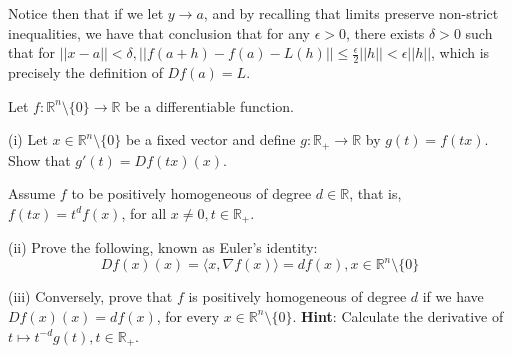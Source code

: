 \begin{solution}
    Notice then that if we let $y \rightarrow a$, and by recalling that limits preserve non-strict inequalities, we have that conclusion that for any $\epsilon > 0$, there exists $\delta > 0$ such that for $\lvert \lvert x - a \rvert \rvert < \delta, \lvert \lvert f(a+ h) - f(a) - L(h) \rvert \rvert \leq \frac{\epsilon}{2} \lvert \lvert h \rvert \rvert < \epsilon \lvert \lvert h \rvert \rvert$, which is precisely the definition of $Df(a) = L$.
\end{solution}

\begin{exercise}{32}
    Let $f: \mathbb{R}^n \setminus \{0\} \rightarrow \mathbb{R}$ be a differentiable function.

    (i) Let $x \in \mathbb{R}^n \setminus \{0\}$ be a fixed vector and define $g: \mathbb{R}_{+} \rightarrow \mathbb{R}$ by $g(t) = f(tx)$.
    Show that $g'(t) = D f(tx)(x)$.

    Assume $f$ to be positively homogeneous of degree $d \in \mathbb{R}$, that is, $f(tx) = t^df(x)$, for all $x \neq 0, t \in \mathbb{R}_{+}$.

    (ii) Prove the following, known as Euler's identity:
    $$Df(x)(x) = \langle x, \nabla f(x) \rangle = d f(x), x \in \mathbb{R}^n \setminus \{0\}$$

    (iii) Conversely, prove that $f$ is positively homogeneous of degree $d$ if we have $Df(x)(x) = df(x)$, for every $x \in \mathbb{R}^n \setminus \{0\}$. \textbf{Hint}: Calculate the derivative of $t \mapsto t^{-d}g(t), t \in \mathbb{R}_{+}$.
\end{exercise}

